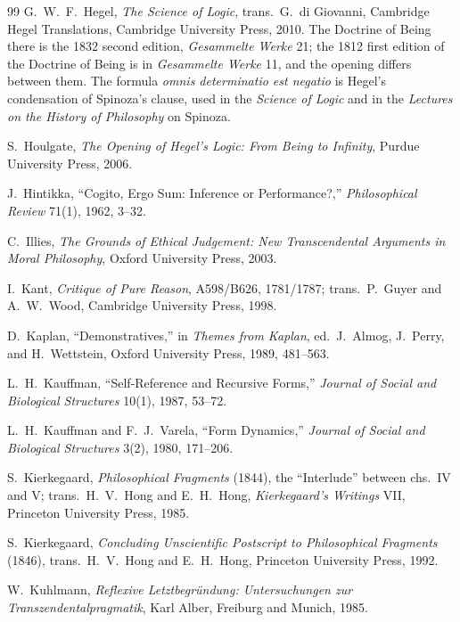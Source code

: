 \documentclass[11pt]{article}
\begin{document}
\begin{thebibliography}{99}
 G.\ W.\ F.\ Hegel, \emph{The Science of Logic}, trans.\ G.\ di Giovanni, Cambridge Hegel Translations, Cambridge University Press, 2010. The Doctrine of Being there is the 1832 second edition, \emph{Gesammelte Werke} 21; the 1812 first edition of the Doctrine of Being is in \emph{Gesammelte Werke} 11, and the opening differs between them. The formula \emph{omnis determinatio est negatio} is Hegel's condensation of Spinoza's clause, used in the \emph{Science of Logic} and in the \emph{Lectures on the History of Philosophy} on Spinoza.

 S.\ Houlgate, \emph{The Opening of Hegel's Logic: From Being to Infinity}, Purdue University Press, 2006.

 J.\ Hintikka, ``Cogito, Ergo Sum: Inference or Performance?,'' \emph{Philosophical Review} 71(1), 1962, 3--32.

 C.\ Illies, \emph{The Grounds of Ethical Judgement: New Transcendental Arguments in Moral Philosophy}, Oxford University Press, 2003.

 I.\ Kant, \emph{Critique of Pure Reason}, A598/B626, 1781/1787; trans.\ P.\ Guyer and A.\ W.\ Wood, Cambridge University Press, 1998.

 D.\ Kaplan, ``Demonstratives,'' in \emph{Themes from Kaplan}, ed.\ J.\ Almog, J.\ Perry, and H.\ Wettstein, Oxford University Press, 1989, 481--563.

 L.\ H.\ Kauffman, ``Self-Reference and Recursive Forms,'' \emph{Journal of Social and Biological Structures} 10(1), 1987, 53--72.

 L.\ H.\ Kauffman and F.\ J.\ Varela, ``Form Dynamics,'' \emph{Journal of Social and Biological Structures} 3(2), 1980, 171--206.

 S.\ Kierkegaard, \emph{Philosophical Fragments} (1844), the ``Interlude'' between chs.\ IV and V; trans.\ H.\ V.\ Hong and E.\ H.\ Hong, \emph{Kierkegaard's Writings} VII, Princeton University Press, 1985.

 S.\ Kierkegaard, \emph{Concluding Unscientific Postscript to Philosophical Fragments} (1846), trans.\ H.\ V.\ Hong and E.\ H.\ Hong, Princeton University Press, 1992.

 W.\ Kuhlmann, \emph{Reflexive Letztbegr\"undung: Untersuchungen zur Transzendentalpragmatik}, Karl Alber, Freiburg and Munich, 1985.


\end{thebibliography}
\end{document}
